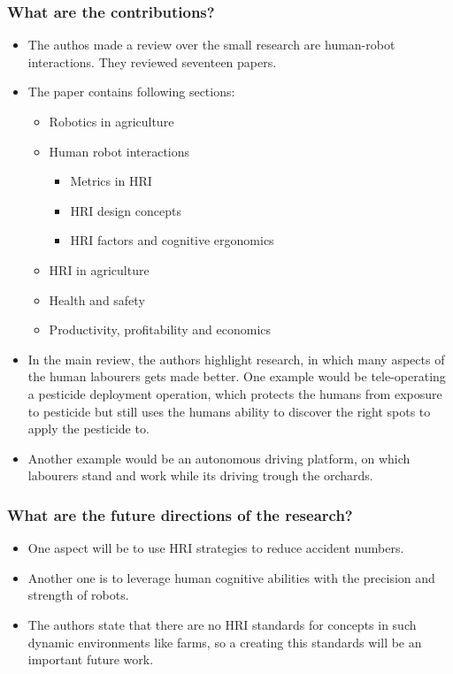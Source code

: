 \documentclass{article}
\begin{document}
\subsubsection*{What are the contributions?}
\begin{itemize}
    \item The authos made a review over the small research are human-robot interactions. They reviewed seventeen papers.
    \item The paper contains following sections: \ \begin{itemize}
        \item Robotics in agriculture
        \item Human robot interactions \ \begin{itemize}
            \item Metrics in HRI
            \item HRI design concepts
            \item HRI factors and cognitive ergonomics
        \end{itemize}
        \item HRI in agriculture
        \item Health and safety
        \item Productivity, profitability and economics
    \end{itemize}
    \item In the main review, the authors highlight research, in which many aspects of the human labourers gets made better. One example would be tele-operating a pesticide deployment operation, which protects the humans from exposure to pesticide but still uses the humans ability to discover the right spots to apply the pesticide to. 
    \item Another example would be an autonomous driving platform, on which labourers stand and work while its driving trough the orchards.
\end{itemize}
\subsubsection*{What are the future directions of the research?}
\begin{itemize}
    \item One aspect will be to use HRI strategies to reduce accident numbers.
    \item Another one is to leverage human cognitive abilities with the precision and strength of robots.
    \item The authors state that there are no HRI standards for concepts in such dynamic environments like farms, so a creating this standards will be an important future work.
\end{itemize}
\end{document}
